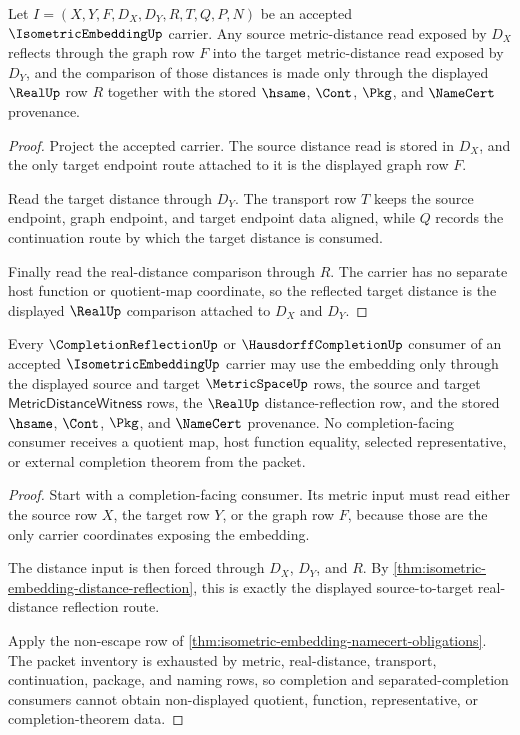 \begin{theorem}
\label{thm:isometric-embedding-distance-reflection}
Let $I=(X,Y,F,D_X,D_Y,R,T,Q,P,N)$ be an accepted $\IsometricEmbeddingUp$ carrier. Any source metric-distance read exposed by $D_X$ reflects through the graph row $F$ into the target metric-distance read exposed by $D_Y$, and the comparison of those distances is made only through the displayed $\RealUp$ row $R$ together with the stored $\hsame$, $\Cont$, $\Pkg$, and $\NameCert$ provenance.
\end{theorem}
\begin{proof}
Project the accepted carrier. The source distance read is stored in $D_X$, and the only target endpoint route attached to it is the displayed graph row $F$.

Read the target distance through $D_Y$. The transport row $T$ keeps the source endpoint, graph endpoint, and target endpoint data aligned, while $Q$ records the continuation route by which the target distance is consumed.

Finally read the real-distance comparison through $R$. The carrier has no separate host function or quotient-map coordinate, so the reflected target distance is the displayed $\RealUp$ comparison attached to $D_X$ and $D_Y$.
\end{proof}

\begin{theorem}
\label{thm:isometric-embedding-completion-boundary}
Every $\CompletionReflectionUp$ or $\HausdorffCompletionUp$ consumer of an accepted $\IsometricEmbeddingUp$ carrier may use the embedding only through the displayed source and target $\MetricSpaceUp$ rows, the source and target $\mathsf{MetricDistanceWitness}$ rows, the $\RealUp$ distance-reflection row, and the stored $\hsame$, $\Cont$, $\Pkg$, and $\NameCert$ provenance. No completion-facing consumer receives a quotient map, host function equality, selected representative, or external completion theorem from the packet.
\end{theorem}
\begin{proof}
Start with a completion-facing consumer. Its metric input must read either the source row $X$, the target row $Y$, or the graph row $F$, because those are the only carrier coordinates exposing the embedding.

The distance input is then forced through $D_X$, $D_Y$, and $R$. By \autoref{thm:isometric-embedding-distance-reflection}, this is exactly the displayed source-to-target real-distance reflection route.

Apply the non-escape row of \autoref{thm:isometric-embedding-namecert-obligations}. The packet inventory is exhausted by metric, real-distance, transport, continuation, package, and naming rows, so completion and separated-completion consumers cannot obtain non-displayed quotient, function, representative, or completion-theorem data.
\end{proof}

